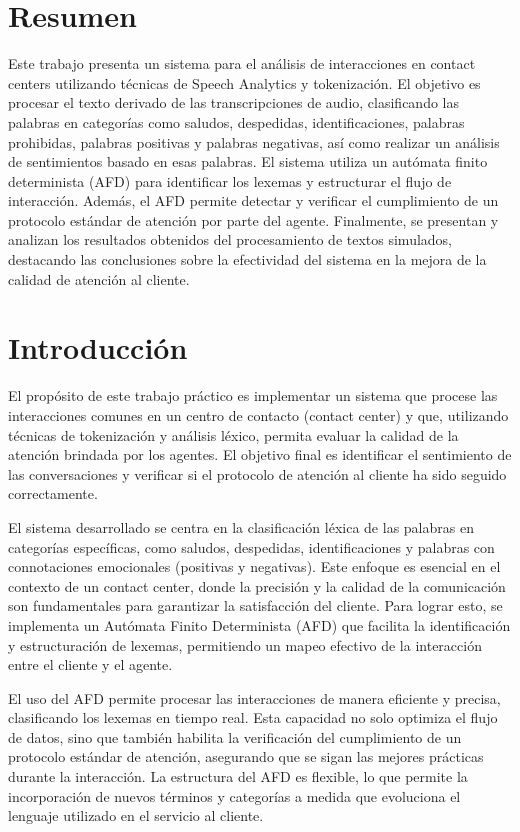 \section*{\centering Resumen}
Este trabajo presenta un sistema para el análisis de interacciones en contact centers
utilizando técnicas de Speech Analytics y tokenización. El objetivo es procesar el texto
derivado de las transcripciones de audio, clasificando las palabras en categorías como saludos,
despedidas, identificaciones, palabras prohibidas, palabras positivas y palabras negativas, así
como realizar un análisis de sentimientos basado en esas palabras. El sistema utiliza un
autómata finito determinista (AFD) para identificar los lexemas y estructurar el flujo de
interacción. Además, el AFD permite detectar y verificar el cumplimiento de un protocolo
estándar de atención por parte del agente. Finalmente, se presentan y analizan los resultados
obtenidos del procesamiento de textos simulados, destacando las conclusiones sobre la
efectividad del sistema en la mejora de la calidad de atención al cliente.

\section{Introducción}
El propósito de este trabajo práctico es implementar un sistema que procese las interacciones
comunes en un centro de contacto (contact center) y que, utilizando técnicas de tokenización y
análisis léxico, permita evaluar la calidad de la atención brindada por los agentes. El
objetivo final es identificar el sentimiento de las conversaciones y verificar si el protocolo
de atención al cliente ha sido seguido correctamente.

El sistema desarrollado se centra en la clasificación léxica de las palabras en categorías
específicas, como saludos, despedidas, identificaciones y palabras con connotaciones
emocionales (positivas y negativas). Este enfoque es esencial en el contexto de un contact
center, donde la precisión y la calidad de la comunicación son fundamentales para garantizar la
satisfacción del cliente. Para lograr esto, se implementa un Autómata Finito Determinista (AFD)
que facilita la identificación y estructuración de lexemas, permitiendo un mapeo efectivo de la
interacción entre el cliente y el agente.

El uso del AFD permite procesar las interacciones de manera eficiente y precisa, clasificando
los lexemas en tiempo real. Esta capacidad no solo optimiza el flujo de datos, sino que también
habilita la verificación del cumplimiento de un protocolo estándar de atención, asegurando que
se sigan las mejores prácticas durante la interacción. La estructura del AFD es flexible, lo
que permite la incorporación de nuevos términos y categorías a medida que evoluciona el
lenguaje utilizado en el servicio al cliente.

